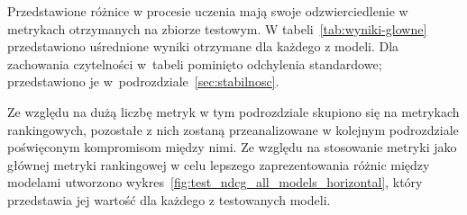 Przedstawione różnice w procesie uczenia mają swoje odzwierciedlenie w metrykach otrzymanych na zbiorze testowym. W tabeli~\ref{tab:wyniki-glowne} przedstawiono uśrednione wyniki otrzymane dla każdego z modeli. Dla zachowania czytelności w~tabeli pominięto odchylenia standardowe;
przedstawiono je w~podrozdziale~\ref{sec:stabilnosc}.

\begin{table}[htbp]
\centering
\caption{Wyniki modeli na zbiorze testowym}
\label{tab:wyniki-glowne}
\caption*{\footnotesize Źródło: opracowanie własne. Wartości dla ALS i BPR to średnie z~pięciu uruchomień, z~wyjątkiem ILD@10, wyznaczonej dla pojedynczego uruchomienia. Pogrubieniem oznaczono najlepszy wynik w~każdej kolumnie.}
\end{table}

Ze względu na dużą liczbę metryk w tym podrozdziale skupiono się na metrykach rankingowych, pozostałe z nich zostaną przeanalizowane w kolejnym podrozdziale poświęconym kompromisom między nimi. Ze względu na stosowanie metryki \ndcg{} jako głównej metryki rankingowej w celu lepszego zaprezentowania różnic między modelami utworzono wykres~\ref{fig:test_ndcg_all_models_horizontal}, który przedstawia jej wartość dla każdego z testowanych modeli.

